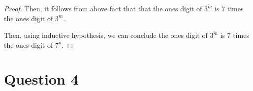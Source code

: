 \documentclass[12pt]{article}
\begin{document}
\begin{itemize}
\begin{mdframed}
\begin{proof}
        \bigskip

        Then, it follows from above fact that that the ones digit of $3^{\tilde{m}}$
        is 7 times the ones digit of $3^m$.

        \bigskip

        Then, using inductive hypothesis, we can conclude the ones digit of $3^{\tilde{m}}$
        is 7 times the ones digit of $7^n$.

        \end{proof}
    \end{mdframed}
\end{itemize}

\section*{Question 4}
\end{document}
